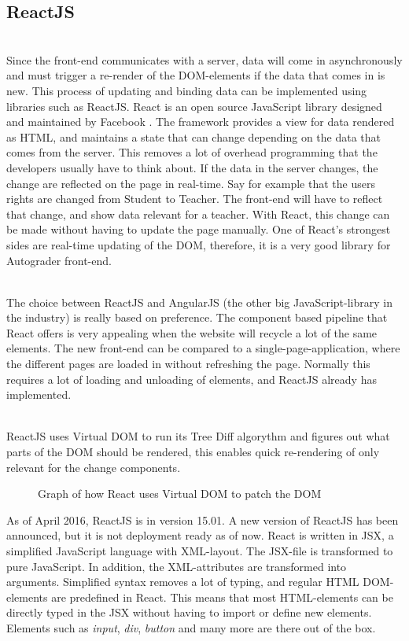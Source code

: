 \subsection{ReactJS}
\\Since the front-end communicates with a server, data will come in asynchronously and must trigger a re-render of the DOM-elements if the data that comes in is new. This process of updating and binding data can be implemented using libraries such as ReactJS. React is an open source JavaScript library designed and maintained by Facebook . The framework provides a view for data rendered as HTML, and maintains a state that can change depending on the data that comes from the server. This removes a lot of overhead programming that the developers usually have to think about. If the data in the server changes, the change are reflected on the page in real-time. Say for example that the users rights are changed from Student to Teacher. The front-end will have to reflect that change, and show data relevant for a teacher. With React, this change can be made without having to update the page manually. One of React's strongest sides are real-time updating of the DOM, therefore, it is a very good library for Autograder front-end. 


\\The choice between ReactJS and AngularJS (the other big JavaScript-library in the industry) is really based on preference. The component based pipeline that React offers is very appealing when the website will recycle a lot of the same elements. The new front-end can be compared to a single-page-application, where the different pages are loaded in without refreshing the page. Normally this requires a lot of loading and unloading of elements, and ReactJS already has implemented. 

\\ReactJS uses Virtual DOM to run its Tree Diff algorythm and figures out what parts of the DOM should be rendered, this enables quick re-rendering of only relevant for the change components.

\begin{figure}[h]
\centering
{}
\caption{Graph of how React uses Virtual DOM to patch the DOM}
\end{figure}

As of April 2016, ReactJS is in version 15.01. A new version of ReactJS has been announced, but it is not deployment ready as of now. React is written in JSX, a simplified JavaScript language with XML-layout. The JSX-file is transformed to pure JavaScript. In addition, the XML-attributes are transformed into arguments. Simplified syntax removes a lot of typing, and regular HTML DOM-elements are predefined in React. This means that most HTML-elements can be directly typed in the JSX without having to import or define new elements. Elements such as \emph{input}, \emph{div}, \emph{button} and many more are there out of the box.

